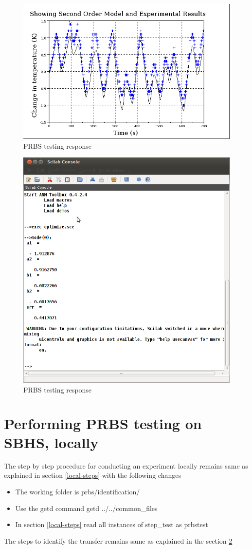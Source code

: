 \begin{figure}
\centering
\includegraphics[width=0.7\linewidth]{prbs/prbs-fit.png}
\caption{PRBS testing response}
\label{prbs-fit}
\end{figure}

\begin{figure}
\centering
\includegraphics[width=0.7\linewidth]{prbs/prbs-model.png}
\caption{PRBS testing response}
\label{prbs-model}
\end{figure}



\section{Performing PRBS testing on SBHS, locally}
The step by step procedure for conducting an experiment locally remains same as explained in section \ref{local-steps} with the following changes
\begin{itemize}
\item The working folder is prbs/identification/
\item Use the getd command getd ../../common\_files
\item In section \ref{local-steps} read all instances of step\_test as prbstest
\end{itemize}
The steps to identify the transfer remains same as explained in the section \ref{prbs-model}

